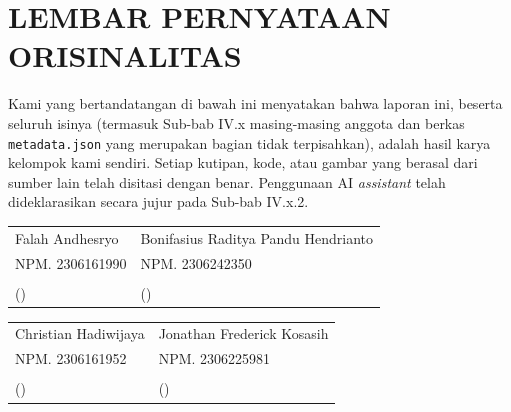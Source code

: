 \documentclass[11pt,a4paper,oneside]{report}
\begin{document}
\chapter*{LEMBAR PERNYATAAN ORISINALITAS}

Kami yang bertandatangan di bawah ini menyatakan bahwa laporan ini, beserta seluruh isinya (termasuk Sub-bab IV.x masing-masing anggota dan berkas \texttt{metadata.json} yang merupakan bagian tidak terpisahkan), adalah hasil karya kelompok kami sendiri. Setiap kutipan, kode, atau gambar yang berasal dari sumber lain telah disitasi dengan benar. Penggunaan AI \textit{assistant} telah dideklarasikan secara jujur pada Sub-bab IV.x.2.

\vspace{1.5cm}

\noindent
\begin{tabular}{p{}p{}}
\centering Falah Andhesryo & \centering Bonifasius Raditya Pandu Hendrianto \tabularnewline
\centering NPM. 2306161990 & \centering NPM. 2306242350 \tabularnewline
\vspace{1.5cm} & \vspace{1.5cm} \tabularnewline
\centering (\hspace{4cm}) & \centering (\hspace{4cm}) \tabularnewline
\end{tabular}

\vspace{1cm}

\noindent
\begin{tabular}{p{}p{}}
\centering Christian Hadiwijaya & \centering Jonathan Frederick Kosasih \tabularnewline
\centering NPM. 2306161952 & \centering NPM. 2306225981 \tabularnewline
\vspace{1.5cm} & \vspace{1.5cm} \tabularnewline
\centering (\hspace{4cm}) & \centering (\hspace{4cm}) \tabularnewline
\end{tabular}

\tableofcontents
\listoffigures
\listoftables
\end{document}
